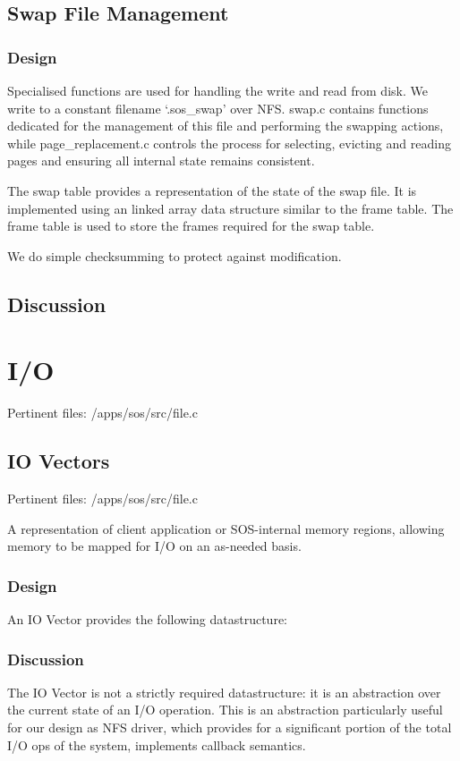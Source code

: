 \documentclass[a4paper,12pt]{article}
\begin{document}
\subsection{Swap File Management}
\subsubsection{Design}
Specialised functions are used for handling the write and read from disk.  We
write to a constant filename `.sos\_swap' over NFS.  swap.c contains functions
dedicated for the management of this file and performing the swapping actions,
while page\_replacement.c controls the process for selecting, evicting and
reading pages and ensuring all internal state remains consistent.

The swap table provides a representation of the state of the swap file.  It is
implemented using an linked array data structure similar to the frame table.
The frame table is used to store the frames required for the swap table.

We do simple checksumming to protect against modification.
\subsection{Discussion}


\section{I/O}
Pertinent files: /apps/sos/src/file.c

\subsection{IO Vectors}
Pertinent files: /apps/sos/src/file.c

A representation of client application or SOS-internal memory regions,
allowing memory to be mapped for I/O on an as-needed basis.

\subsubsection{Design}
An IO Vector provides the following datastructure:


\subsubsection{Discussion}
The IO Vector is not a strictly required datastructure: it is an abstraction
over the current state of an I/O operation.  This is an abstraction
particularly useful for our design as NFS driver, which provides for a
significant portion of the total I/O ops of the system, implements callback
semantics.
\end{document}
